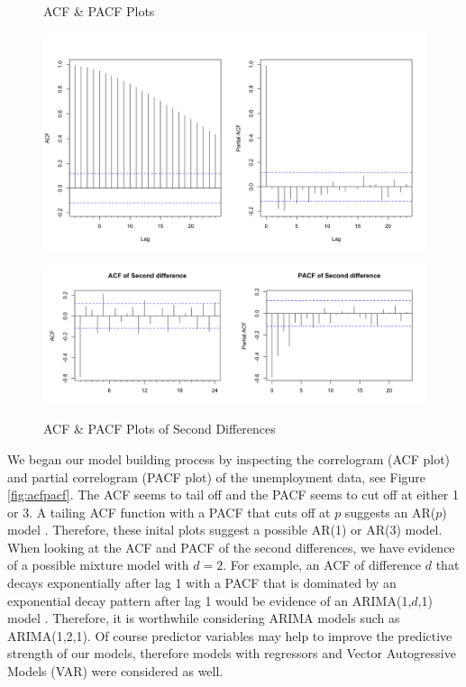\documentclass[twoside,twocolumn]{article}
\begin{document}
 
    \begin{figure}[hbt]
    	\centering
     	\caption{ACF \& PACF Plots}
     	\includegraphics[width=\linewidth]{images/acfpacf}
     	\label{fig:acfpacf}
     	\caption{ACF \& PACF Plots of Second Differences}
     	\includegraphics[width=\linewidth]{images/acfpacf2d}
     	\label{fig:acfpacf2}
      \end{figure}

  We began our model building process by inspecting the correlogram (ACF plot) and partial correlogram (PACF plot) of the unemployment data, see Figure \ref{fig:acfpacf}. The ACF seems to tail off and the PACF seems to cut off at either 1 or 3.  A tailing ACF function with a PACF that cuts off at \(p\) suggests an AR(\(p\)) model \citep{Box2008}. Therefore, these inital plots suggest a possible AR(1) or AR(3) model. When looking at the ACF and PACF of the second differences, we have evidence of a possible mixture model with \(d=2\). For example, an ACF of difference \(d\) that decays exponentially after lag 1 with a PACF that is dominated by an exponential decay pattern after lag 1 would be evidence of an ARIMA(1,\(d\),1) model . Therefore, it is worthwhile considering ARIMA models such as ARIMA(1,2,1). Of course predictor variables may help to improve the predictive strength of our models, therefore models with regressors and Vector Autogressive Models (VAR) were considered as well.
\end{document}
